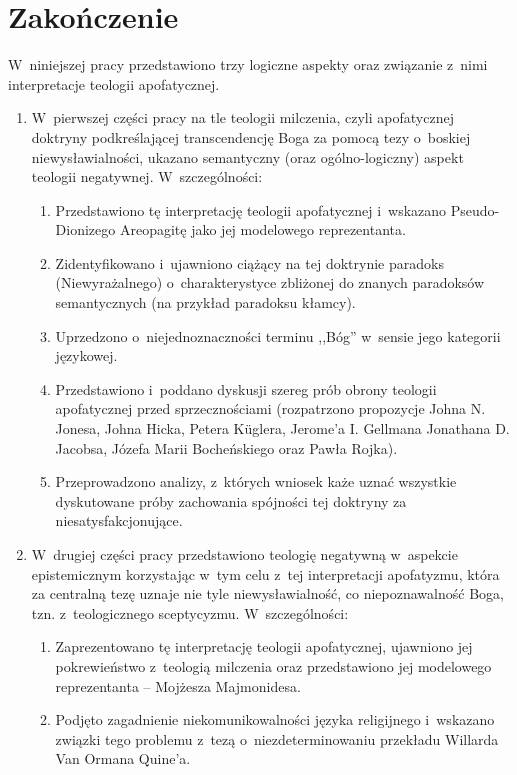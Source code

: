 \chapter{Zakończenie}

W~niniejszej pracy przedstawiono trzy logiczne aspekty oraz związanie z~nimi interpretacje teologii apofatycznej.

\begin{enumerate}
\item  W~pierwszej części pracy na tle teologii milczenia, czyli apofatycznej doktryny podkreślającej transcendencję Boga za pomocą tezy o~boskiej niewysławialności, ukazano semantyczny (oraz ogólno-logiczny) aspekt teologii negatywnej. W~szczególności:
\begin{enumerate}
\item Przedstawiono tę interpretację teologii apofatycznej i~wskazano Pseudo-Dionizego Areopagitę jako jej modelowego reprezentanta.
\item Zidentyfikowano i~ujawniono ciążący na tej doktrynie paradoks (Niewyrażalnego) o~charakterystyce zbliżonej do znanych paradoksów semantycznych (na przykład paradoksu kłamcy).
\item Uprzedzono o~niejednoznaczności terminu ,,Bóg'' w~sensie jego kategorii językowej.
\item Przedstawiono i~poddano dyskusji szereg prób obrony teologii apofatycznej przed sprzecznościami (rozpatrzono propozycje Johna N. Jonesa, Johna Hicka, Petera Küglera, Jerome'a I. Gellmana Jonathana D. Jacobsa, Józefa Marii Bocheńskiego oraz Pawła Rojka).
\item Przeprowadzono analizy, z~których wniosek każe uznać wszystkie dyskutowane próby zachowania spójności tej doktryny za niesatysfakcjonujące.
\end{enumerate}
\item W~drugiej części pracy przedstawiono teologię negatywną w~aspekcie epistemicznym korzystając w~tym celu z~tej interpretacji apofatyzmu, która za centralną tezę uznaje nie tyle niewysławialność, co niepoznawalność Boga, tzn. z~teologicznego sceptycyzmu. W~szczególności:
\begin{enumerate}
\item Zaprezentowano tę interpretację teologii apofatycznej, ujawniono jej pokrewieństwo z~teologią milczenia oraz przedstawiono jej modelowego reprezentanta -- Mojżesza Majmonidesa.
\item Podjęto zagadnienie niekomunikowalności języka religijnego i~wskazano związki tego problemu z~tezą o~niezdeterminowaniu przekładu Willarda Van Ormana Quine'a.

\end{enumerate}
\end{enumerate}
